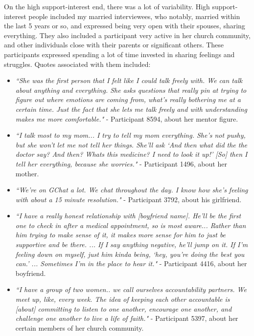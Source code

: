   On the high support-interest end, there was a lot of variability.
  High support-interest people included my married interviewees, who notably,
  married within the last 5 years or so,
  and expressed being very open with their spouses, sharing everything.
  They also included a participant very active in her church community,
  and other individuals close with their parents or significant others.
  These participants expressed spending a lot of time invested in
  sharing feelings and struggles.
  Quotes associated with them included:
  \begin{itemize}
  \item \textit{
  ``She was the first person that I felt like I could talk freely with.
  We can talk about anything and everything.
  She asks questions that really pin at trying to figure out
  where emotions are coming from, what's really bothering me at a certain time.
  Just the fact that she lets me talk freely and with understanding
  makes me more comfortable."
  }
  - Participant 8594, about her mentor figure.
  \item \textit{
  ``I talk most to my mom... I try to tell my mom everything.
  She's not pushy, but she won't let me not tell her things.
  She'll ask `And then what did the the doctor say? And then?
  Whats this medicine? I need to look it up!'
  [So] then I tell her everything, because she worries."
  }
  - Participant 1496, about her mother.
  \item  \textit{
  ``We're on GChat a lot.
  We chat throughout the day.
  I know how she's feeling with about a 15 minute resolution."
  }
  - Participant 3792, about his girlfriend.
  \item \textit{
  ``I have a really honest relationship with [boyfriend name].
  He'll be the first one to check in after a medical appointment,
  so is most aware...
  Rather than him trying to make sense of it,
  it makes more sense for him to just be supportive and be there.
  ... If I say anything negative, he'll jump on it.
  If I'm feeling down on myself,
  just him kinda being, `hey, you're doing the best you can.'
  ... Sometimes I'm in the place to hear it."
  }
  - Participant 4416, about her boyfriend.
  \item \textit{
  ``I have a group of two women.. we call ourselves accountability partners.
  We meet up, like, every week.
  The idea of keeping each other accountable is
  [about] committing to listen to one another, encourage one another,
  and challenge one another to live a life of faith."
  }
  - Participant 5397, about her certain members of her church community.
  \end{itemize}

